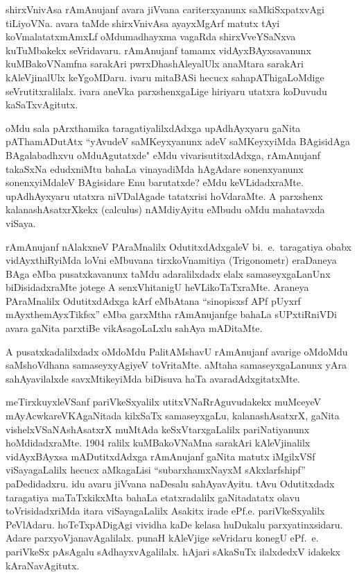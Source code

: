 shirxVnivAsa rAmAnujanf avara jiVvana cariterxyanunx saMkiSxpatxvAgi tiLiyoVNa. avara taMde shirxVnivAsa ayayxMgArf matutx tAyi koVmalatatxmAmxLf oMdu\break madhayxma vagaRda shirxVveYSaNxva kuTuMbakekx seVridavaru. rAmAnujanf tamamx vidAyxBAyxsa\-vanunx kuMBakoVNamfna sarakAri pwrxDhashAleyalUlx anaMtara sarakAri kAleVjinalUlx keYgoMDaru. ivaru mitaBASi hecucx sahapAThigaLoMdige seVrutitxralilalx. ivara aneVka parxshenxgaLige hiriyaru utatxra koDuvudu kaSaTxvAgitutx.

oMdu sala pArxthamika taragatiyalilxdAdxga upAdhAyxyaru gaNita pATha\-mADutAtx ``yAvudeV saMKeyxyanunx adeV saMKeyxyiMda BAgisidAga BAgalabadhxvu oMdu\break Agutatxde" eMdu vivarisutitxdAdxga, rAmAnujanf takaSxNa edudxniMtu bahaLa vinayadiMda hAgAdare sonenxyanunx sonenxyiMdaleV BAgisidare Enu barutatxde? eMdu keVLidadxraMte. upAdhAyxyaru utatxra niVDalAgade tatatxrisi hoVdaraMte. A parxshenx kalanashAsatxrXkekx {\rm (calculus)} nAMdiyAyitu eMbudu oMdu mahatavxda viSaya. 

rAmAnujanf nAlakxneV PAraMnalilx OdutitxdAdxgaleV bi.~e.~taragatiya obabx vidAyxthiRyiMda loVni eMbuvana tirxkoVnamitiya {\rm (Trigonometr)} eraDaneya BAga eMba pusatxkavanunx taMdu adaralilxdadx elalx samaseyxgaLanUnx biDisidadxraMte jotege A senxVhita\-nigU heVLikoTaTxraMte. Araneya PAraMnalilx OdutitxdAdxga kArf eMbAtana ``sinopisxsf APf pUyxrf mAyxthemAyxTikfsx'' eMba garxMtha rAmAnujanfge bahaLa sUPxtiRniVDi avara gaNita parxtiBe vikAsagoLaLxlu sahAya mADitaMte.

A pusatxkadalilxdadx oMdoMdu PalitAMshavU rAmAnujanf avarige oMdoMdu saMshoVdhana samaseyxyAgiyeV toVritaMte. aMtaha samaseyxgaLanunx yAra sahAya\-vilalxde savxMtikeyiMda biDisuva haTa avaradAdxgitatxMte.

meTirxkuyxleVSanf pariVkeSxyalilx utitxVNaRrAguvudakekx muMceyeV mAyAcwka\break reVKAgaNitada kilxSaTx samaseyxgaLu, kalanashAsatxrX, gaNita vishelxVSaNAshAsatxrX muMtAda keSxVtarxgaLalilx pariNatiyanunx hoMdidadxraMte. {\rm 1904} ralilx kuMBakoVNaMna sarakAri kAleVjinalilx vidAyxBAyxsa mADutitxdAdxga rAmAnujanf gaNita matutx iMgilxVSf viSayagaLalilx hecucx aMkagaLisi ``subarxhamxNayxM sAkxlarfshipf'' paDedidadxru. idu avaru jiVvana naDesalu sahAyavAyitu. tAvu Odutitxdadx taragatiya maTaTxkikxMta bahaLa etatxradalilx gaNita\-datatx olavu toVrisidadxriMda itara viSayagaLalilx Asakitx irade ePf.e. pariVkeSxyalilx PeVlAdaru. hoTeTxpADigAgi vividha kaDe kelasa huDukalu parxyatinxsidaru. Adare parxyoVjanavAgalilalx. punaH kAleVjige seVridaru konegU ePf.~e. pariVkeSx pAsAgalu sAdhayxvAgalilalx. hAjari sAkaSuTx ilalxdedxV idakekx kAraNavAgitutx.


